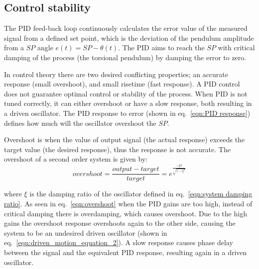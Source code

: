 \documentclass[\main/master.tex]{subfiles}
\begin{document}
\subsection{Control stability}
The PID feed-back loop continuously calculates the error value of the measured signal from a defined set point, which is the deviation of the pendulum amplitude from a $SP$ angle $e(t) =SP -\theta(t) $. The PID aims to reach the $SP$ with critical damping of the process (the torsional pendulum) by damping the error to zero. 
\par\noindent
In control theory there are two desired conflicting properties; an accurate response (small overshoot), and small risetime (fast response). A PID control does not guarantee optimal control or stability of the process. When PID is not tuned correctly, it can either overshoot or have a slow response, both resulting in a driven oscillator. The PID response to error (shown in eq.~\ref{eqn:PID response}) defines how much will the oscillator overshoot the $SP$.
\par\noindent
Overshoot is when the value of output signal (the actual response) exceeds the target value (the desired response), thus the response is not accurate. The overshoot of a second order system is given by:
\begin{equation}
overshoot =  \frac{output-target}{target} = e ^{\frac{-\xi\pi}{\sqrt{1-\xi^2}}}  \label{eqn:overshoot}
\end{equation}
\par\noindent
where $\xi$ is the damping ratio of the oscillator defined in eq.~\ref{eqn:system damping ratio}. As seen in eq.~\ref{eqn:overshoot} when the PID gains are too high, instead of critical damping there is overdamping, which causes overshoot. Due to the high gains the overshoot response overshoots again to the other side, causing the system to be an undesired driven oscillator (shown in eq.~\ref{eqn:driven_motion_equation_2}). A slow response causes phase delay between the signal and the equivalent PID response, resulting again in a driven oscillator.
\end{document}
